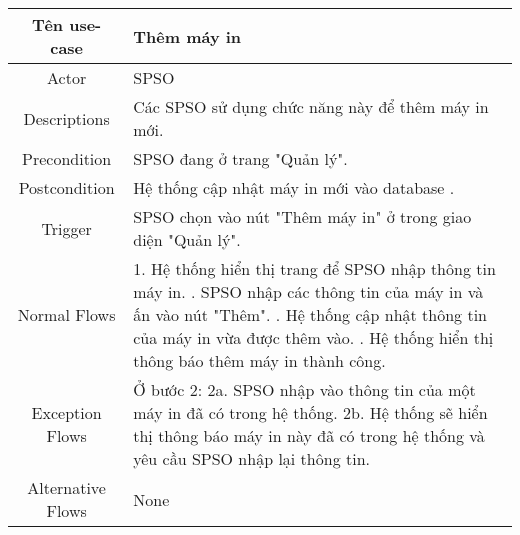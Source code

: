 \begin{xltabular}{\textwidth}{|c|X|}
    \hline
    \textbf{Tên use-case} & \textbf{Thêm máy in} \\
    \hline
    Actor & SPSO \\
    \hline
    Descriptions & Các SPSO sử dụng chức năng này để thêm máy in mới. \\
    \hline 
    Precondition &SPSO đang ở trang "Quản lý". \\
    \hline
    Postcondition &Hệ thống cập nhật máy in mới vào database .\\
    \hline
    Trigger &SPSO chọn vào nút "Thêm máy in" ở trong giao diện "Quản lý".
    \\
    \hline
    Normal Flows & 
    1. Hệ thống hiển thị trang để SPSO nhập thông tin máy in.
    . SPSO nhập các thông tin của máy in và ấn vào nút "Thêm".
    . Hệ thống cập nhật thông tin của máy in vừa được thêm vào.
    . Hệ thống hiển thị thông báo thêm máy in thành công.
    \newline
    \\
    \hline
    Exception Flows & Ở bước 2:\newline
    2a. SPSO nhập vào thông tin của một máy in đã có trong hệ thống.\newline
    2b. Hệ thống sẽ hiển thị thông báo máy in này đã có trong hệ thống và yêu cầu SPSO nhập lại thông tin.
    \\
    \hline
    Alternative Flows & None
    
    \hline
\end{xltabular}
